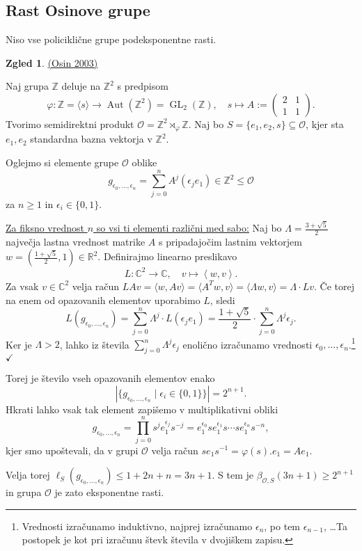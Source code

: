 \documentclass[11pt]{book}
\def\ZZ{\mathbb{Z}}
\def\RR{\mathbb{R}}
\def\CC{\mathbb{C}}
\DeclareMathOperator\Aut{Aut}
\DeclareMathOperator\GL{GL}
\def\kljuka{$\checkmark$}
\theoremstyle{definition}
\theoremstyle{zgled}
\newtheorem*{zgled}{Zgled}
\theoremstyle{odprtproblem}
\theoremstyle{domacanaloga}
\theoremstyle{izrek}
\begin{document}
\subsection{Rast Osinove grupe}

Niso vse policiklične grupe podeksponentne rasti.

\begin{zgled}\href{https://citeseerx.ist.psu.edu/viewdoc/download?doi=10.1.1.520.8970&rep=rep1&type=pdf}{(Osin 2003)}

Naj grupa $\ZZ$ deluje na $\ZZ^2$ s predpisom
\[
\varphi \colon \ZZ = \langle s \rangle \to \Aut(\ZZ^2) = \GL_2(\ZZ), \quad
s \mapsto A := \begin{pmatrix}
2 & 1 \\ 1 & 1
\end{pmatrix}.
\]
Tvorimo semidirektni produkt $\mathcal{O} = \ZZ^2 \rtimes_\varphi \ZZ$. Naj bo $S = \{ e_1, e_2, s \} \subseteq \mathcal{O}$, kjer sta $e_1, e_2$ standardna bazna vektorja v $\ZZ^2$. 

Oglejmo si elemente grupe $\mathcal{O}$ oblike
\[
g_{\epsilon_0, \dots, \epsilon_n} = \sum_{j = 0}^n A^j(\epsilon_j e_1) \in \ZZ^2 \leq \mathcal{O}
\]
za $n \geq 1$ in $\epsilon_i \in \{ 0, 1 \}$. 

\underline{Za fiksno vrednost $n$ so vsi ti elementi različni med sabo:} 
Naj bo $\Lambda = \frac{3 + \sqrt{5}}{2}$ največja lastna vrednost matrike $A$ s pripadajočim lastnim vektorjem $w = (\frac{1 + \sqrt{5}}{2}, 1) \in \RR^2$. Definirajmo linearno preslikavo
\[
L \colon \CC^2 \to \CC, \quad
v \mapsto \left\langle w, v \right\rangle.
\]
Za vsak $v \in \CC^2$ velja račun $LAv = \langle w, Av \rangle = \langle A^T w, v \rangle = \langle \Lambda w, v \rangle = \Lambda \cdot Lv$. Če torej na enem od opazovanih elementov uporabimo $L$, sledi
\[
L(g_{\epsilon_0, \dots, \epsilon_n}) = \sum_{j = 0}^n \Lambda^j \cdot L(\epsilon_j e_1) = \frac{1 + \sqrt{5}}{2} \cdot \sum_{j = 0}^n \Lambda^j \epsilon_j.
\]
Ker je $\Lambda > 2$, lahko iz števila $\sum_{j = 0}^n \Lambda^j \epsilon_j$ enolično izračunamo vrednosti $\epsilon_0, \dots, \epsilon_n$.\footnote{Vrednosti izračunamo induktivno, najprej izračunamo $\epsilon_n$, po tem $\epsilon_{n-1}$, \dots Ta postopek je kot pri izračunu števk števila v dvojiškem zapisu.} \kljuka

Torej je število vseh opazovanih elementov enako
\[
|\{ g_{\epsilon_0, \dots, \epsilon_n} \mid \epsilon_i \in \{ 0, 1 \} \}| = 2^{n+1}.
\]
Hkrati lahko vsak tak element zapišemo v multiplikativni obliki
\[
g_{\epsilon_0, \dots, \epsilon_n} = \prod_{j = 0}^n s^j e_1^{\epsilon_j} s^{-j} = e_1^{\epsilon_0} s e_1^{\epsilon_1} s \cdots s e_1^{\epsilon_n} s^{-n},
\]
kjer smo upoštevali, da v grupi $\mathcal{O}$ velja račun $s e_1 s^{-1} = \varphi(s).e_1 = Ae_1$. 

Velja torej $\ell_S(g_{\epsilon_0, \dots, \epsilon_n}) \leq 1 + 2n + n = 3n + 1$. S tem je $\beta_{\mathcal{O},S}(3n+1) \geq 2^{n+1}$ in grupa $\mathcal{O}$ je zato eksponentne rasti.
\end{zgled}
\end{document}
